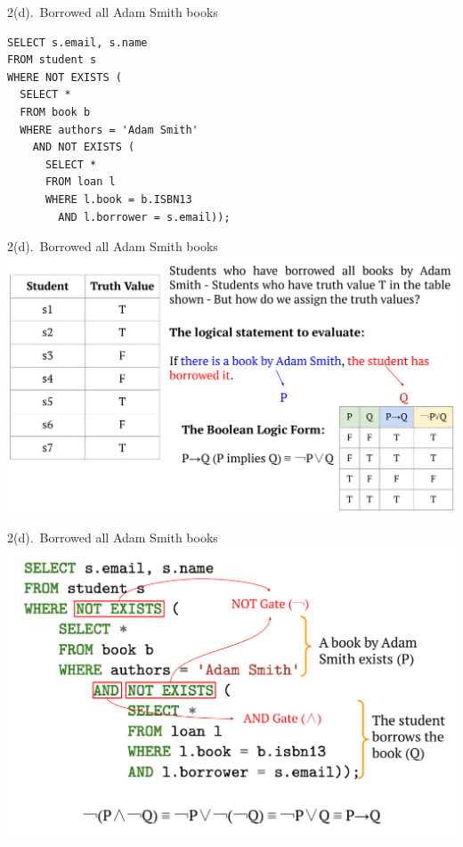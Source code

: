 \documentclass{beamer}
\begin{document}
\begin{frame}[fragile]{2(d).\ Borrowed all Adam Smith books}
\begin{lstlisting}
SELECT s.email, s.name
FROM student s
WHERE NOT EXISTS (
  SELECT *
  FROM book b
  WHERE authors = 'Adam Smith'
    AND NOT EXISTS (
      SELECT *
      FROM loan l
      WHERE l.book = b.ISBN13
        AND l.borrower = s.email));
\end{lstlisting}
\end{frame}

\begin{frame}[fragile]{2(d).\ Borrowed all Adam Smith books}
\includegraphics[scale = 0.45]{tut_07_images/tut_07_02.pdf}
\end{frame}

\begin{frame}[fragile]{2(d).\ Borrowed all Adam Smith books}
\includegraphics[scale = 0.45]{tut_07_images/tut_07_01.pdf}
\end{frame}
\end{document}

